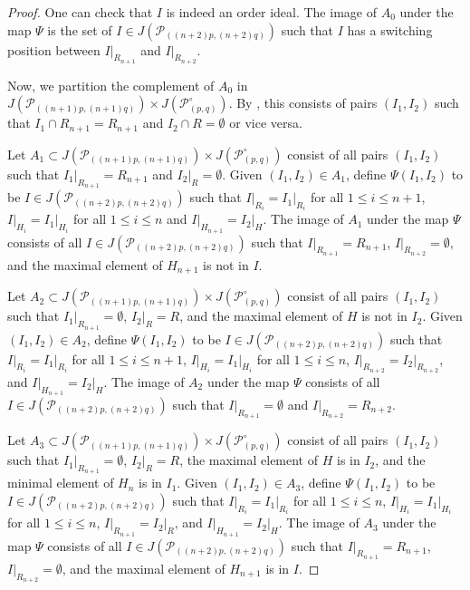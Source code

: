 \documentclass{article}
\theoremstyle{remark}
\newcommand{\calP}{\mathcal{P}}
\begin{document}
\begin{proof}
One can check that $I$ is indeed an order ideal. The image of $A_0$ under the map $\Psi$ is the set of $I \in J(\calP_{((n+2)p,(n+2)q)})$ such that $I$ has a switching position between $I \vert_{R_{n+1}}$ and $I \vert_{R_{n+2}}$. 

 Now, we partition the complement of $A_0$ in $J(\calP_{((n+1)p,(n+1)q)}) \times J(\calP^\circ_{(p,q)})$. By \cite[Lemma 3]{banaian2024skein}, this consists of pairs $(I_1,I_2)$ such that $I_1 \cap R_{n+1} = R_{n+1}$ and $I_2 \cap R = \emptyset$ or vice versa. 

Let $A_1 \subset J(\calP_{((n+1)p,(n+1)q)}) \times J(\calP^\circ_{(p,q)})$ consist of all pairs $(I_1,I_2)$ such that $I_1 \vert_{R_{n+1}} = R_{n+1}$ and $I_2 \vert_R = \emptyset$. Given $(I_1,I_2) \in A_1$, define $\Psi(I_1,I_2)$ to be $I \in J(\calP_{((n+2)p,(n+2)q)})$ such that $I \vert_{R_i} = I_1 \vert_{R_i}$ for all $1 \leq i \leq n+1$, $I \vert_{H_i} = I_1 \vert_{H_i}$ for all $1 \leq i \leq n$ and $I \vert_{H_{n+1}} = I_2 \vert_{H}$. The image of $A_1$ under the map $\Psi$ consists of all $I \in J(\calP_{((n+2)p,(n+2)q)})$ such that $I \vert_{R_{n+1}} = R_{n+1}$, $I \vert_{R_{n+2}} = \emptyset$, and the maximal element of $H_{n+1}$ is not in $I$.

Let $A_2 \subset J(\calP_{((n+1)p,(n+1)q)}) \times J(\calP^\circ_{(p,q)})$ consist of all pairs $(I_1,I_2)$ such that $I_1 \vert_{R_{n+1}} = \emptyset$, $I_2 \vert_R = R$, and the maximal element of $H$ is not in $I_2$. Given $(I_1,I_2) \in A_2$, define $\Psi(I_1,I_2)$ to be $I \in J(\calP_{((n+2)p,(n+2)q)})$ such that $I \vert_{R_i} = I_1 \vert_{R_i}$ for all $1 \leq i \leq n+1$, $I \vert_{H_i} = I_1 \vert_{H_i}$ for all $1 \leq i \leq n$, $I \vert_{R_{n+2}} = I_2 \vert_{R_{n+2}}$, and $I \vert_{H_{n+1}} = I_2 \vert_{H}$. The image of $A_2$ under the map $\Psi$ consists of all $I \in J(\calP_{((n+2)p,(n+2)q)})$ such that $I \vert_{R_{n+1}} = \emptyset$ and $I \vert_{R_{n+2}} = R_{n+2}$.

Let $A_3 \subset J(\calP_{((n+1)p,(n+1)q)}) \times J(\calP^\circ_{(p,q)})$ consist of all pairs $(I_1,I_2)$ such that $I_1 \vert_{R_{n+1}} = \emptyset$, $I_2 \vert_R = R$, the maximal element of $H$ is in $I_2$, and the minimal element of $H_n$ is in $I_1$.  Given $(I_1,I_2) \in A_3$, define $\Psi(I_1,I_2)$ to be $I \in J(\calP_{((n+2)p,(n+2)q)})$ such that $I \vert_{R_i} = I_1 \vert_{R_i}$ for all $1 \leq i \leq n$, $I \vert_{H_i} = I_1 \vert_{H_i}$ for all $1 \leq i \leq n$, $I \vert_{R_{n+1}} = I_2 \vert_{R}$, and $I \vert_{H_{n+1}} = I_2 \vert_{H}$. The image of $A_3$ under the map $\Psi$ consists of all $I \in J(\calP_{((n+2)p,(n+2)q)})$ such that $I \vert_{R_{n+1}} = R_{n+1}$, $I \vert_{R_{n+2}} = \emptyset$, and the maximal element of $H_{n+1}$ is in $I$.


\end{proof}
\end{document}
